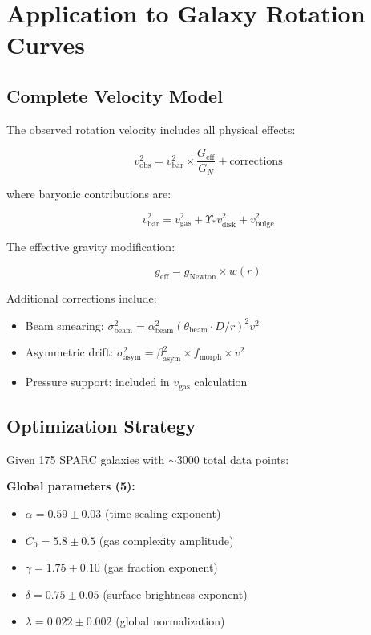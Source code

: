 \documentclass[12pt,letterpaper]{article}
\newcommand{\geff}{G_{\text{eff}}}
\newcommand{\gnewton}{G_N}
\begin{document}
\section{Application to Galaxy Rotation Curves}
\label{sec:galaxies}

\subsection{Complete Velocity Model}

The observed rotation velocity includes all physical effects:

\begin{equation}
v_{\text{obs}}^2 = v_{\text{bar}}^2 \times \frac{\geff}{\gnewton} + \text{corrections}
\label{eq:v_obs}
\end{equation}

where baryonic contributions are:

\begin{equation}
v_{\text{bar}}^2 = v_{\text{gas}}^2 + \Upsilon_* v_{\text{disk}}^2 + v_{\text{bulge}}^2
\label{eq:v_bar}
\end{equation}

The effective gravity modification:

\begin{equation}
g_{\text{eff}} = g_{\text{Newton}} \times w(r)
\label{eq:g_eff}
\end{equation}

Additional corrections include:
\begin{itemize}
\item Beam smearing: $\sigma_{\text{beam}}^2 = \alpha_{\text{beam}}^2(\theta_{\text{beam}} \cdot D/r)^2 v^2$
\item Asymmetric drift: $\sigma_{\text{asym}}^2 = \beta_{\text{asym}}^2 \times f_{\text{morph}} \times v^2$
\item Pressure support: included in $v_{\text{gas}}$ calculation
\end{itemize}

\subsection{Optimization Strategy}

Given 175 SPARC galaxies with $\sim$3000 total data points:

\textbf{Global parameters (5):}
\begin{itemize}
\item $\alpha = 0.59 \pm 0.03$ (time scaling exponent)
\item $C_0 = 5.8 \pm 0.5$ (gas complexity amplitude)
\item $\gamma = 1.75 \pm 0.10$ (gas fraction exponent)
\item $\delta = 0.75 \pm 0.05$ (surface brightness exponent)
\item $\lambda = 0.022 \pm 0.002$ (global normalization)
\end{itemize}
\end{document}
